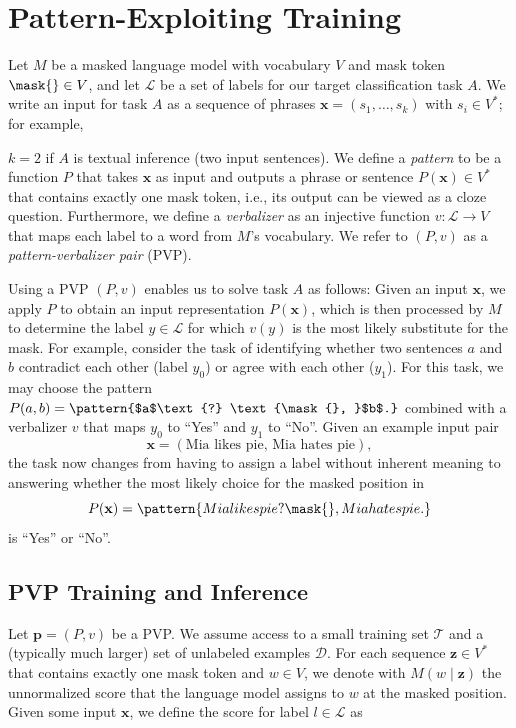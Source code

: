 \section{Pattern-Exploiting Training}

Let $M$ be a masked language model with vocabulary $V$ and mask token $\mask{} \in V$, and let $\mathcal{L}$ be a set of labels for our target classification task $A$. We write an input for task $A$ as a sequence of phrases 
$\mathbf{x} = (s_1, \ldots, s_k)$ with $s_i \in V^*$; for example, 

$k=2$ if $A$ is textual inference (two input sentences). We define a \emph{pattern} to be a function $P$ that takes $\mathbf{x}$ as input and outputs a phrase or sentence $P(\mathbf{x}) \in V^*$ that contains exactly one mask token, i.e., its output can be viewed as a cloze question. Furthermore, we define a \emph{verbalizer} as an injective function $v: \mathcal{L} \rightarrow V$ that maps each label to a word from $M$'s vocabulary. We refer to $(P, v)$ as a \emph{pattern-verbalizer pair} (PVP).

Using a PVP $(P,v)$ enables us to solve task $A$ as follows: Given an input $\mathbf{x}$, we apply $P$ to obtain an input representation $P(\mathbf{x})$, which is then processed by $M$ to determine the label $y \in \mathcal{L}$ for which $v(y)$ is the most likely substitute for the mask. For example, consider the task of identifying whether two sentences $a$ and $b$ contradict each other (label $y_0$) or agree with each other ($y_1$). For this task, we may choose the pattern $ P(a,b) = \pattern{$a$\text{?} \text{\mask{}, }$b$.} $ combined with a verbalizer $v$ that maps $y_0$ to ``Yes'' and $y_1$ to ``No''. Given an example input pair 
\[
\mathbf{x} = (\text{Mia likes pie, Mia hates pie}),
\] the task now changes from having to assign a label without inherent meaning  to answering whether the most likely choice for the masked position in
\[
P(\mathbf{x}) = \pattern{Mia likes pie? \mask{}, Mia hates pie.}
\]
is ``Yes'' or ``No''.

\subsection{PVP Training and Inference}
\label{pvp-training}

Let $\mathbf{p} = (P,v)$ be a PVP. We assume access to a small training set $\mathcal{T}$ and a (typically much larger) set of unlabeled examples $\mathcal{D}$.
For each sequence $\mathbf{z} \in V^*$ that contains exactly one mask token and $w \in V$, we denote with $M(w \mid \mathbf{z})$ the unnormalized score that the language model assigns to $w$ at the masked position. Given some input $\mathbf{x}$, we define the  score for label $l \in \mathcal{L}$ as

